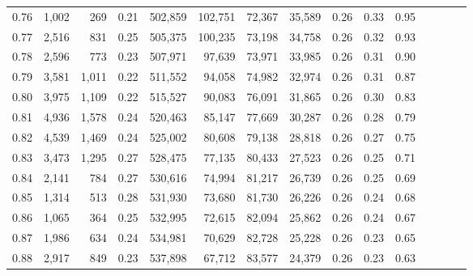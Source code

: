 \begin{tabular}{rrrcrrrrrrrrrrr}
0.76 &   1,002 &    269 &                                       0.21 &  502,859 &  102,751 &   72,367 &   35,589 &  0.26 &  0.33 &                         0.95 \\
0.77 &   2,516 &    831 &                                       0.25 &  505,375 &  100,235 &   73,198 &   34,758 &  0.26 &  0.32 &                         0.93 \\
0.78 &   2,596 &    773 &                                       0.23 &  507,971 &   97,639 &   73,971 &   33,985 &  0.26 &  0.31 &                         0.90 \\
0.79 &   3,581 &  1,011 &                                       0.22 &  511,552 &   94,058 &   74,982 &   32,974 &  0.26 &  0.31 &                         0.87 \\
0.80 &   3,975 &  1,109 &                                       0.22 &  515,527 &   90,083 &   76,091 &   31,865 &  0.26 &  0.30 &                         0.83 \\
0.81 &   4,936 &  1,578 &                                       0.24 &  520,463 &   85,147 &   77,669 &   30,287 &  0.26 &  0.28 &                         0.79 \\
0.82 &   4,539 &  1,469 &                                       0.24 &  525,002 &   80,608 &   79,138 &   28,818 &  0.26 &  0.27 &                         0.75 \\
0.83 &   3,473 &  1,295 &                                       0.27 &  528,475 &   77,135 &   80,433 &   27,523 &  0.26 &  0.25 &                         0.71 \\
0.84 &   2,141 &    784 &                                       0.27 &  530,616 &   74,994 &   81,217 &   26,739 &  0.26 &  0.25 &                         0.69 \\
0.85 &   1,314 &    513 &                                       0.28 &  531,930 &   73,680 &   81,730 &   26,226 &  0.26 &  0.24 &                         0.68 \\
0.86 &   1,065 &    364 &                                       0.25 &  532,995 &   72,615 &   82,094 &   25,862 &  0.26 &  0.24 &                         0.67 \\
0.87 &   1,986 &    634 &                                       0.24 &  534,981 &   70,629 &   82,728 &   25,228 &  0.26 &  0.23 &                         0.65 \\
0.88 &   2,917 &    849 &                                       0.23 &  537,898 &   67,712 &   83,577 &   24,379 &  0.26 &  0.23 &                         0.63 \\

\end{tabular}
